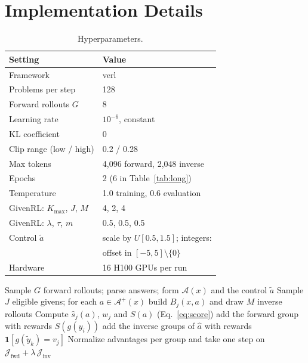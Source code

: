 \documentclass[11pt]{article}
\theoremstyle{remark}
\newcommand{\method}{GivenRL\xspace}
\newcommand{\cA}{\mathcal{A}}
\newcommand{\Aplus}{\mathcal{A}^{+}}
\newcommand{\ind}{\mathbf{1}}
\newcommand{\shat}{\hat{s}}
\newcommand{\atilde}{\tilde{a}}
\newcommand{\ahat}{\hat{a}}
\newcommand{\Kmax}{K_{\max}}
\begin{document}
\section{Implementation Details}
\label{app:impl}

\begin{table}[H]
  \centering
  \small
  \setlength{\tabcolsep}{4pt}
  \begin{tabular}{@{}ll@{}}
    \toprule
    Setting & Value \\
    \midrule
    Framework & verl \\
    Problems per step & 128 \\
    Forward rollouts $G$ & 8 \\
    Learning rate & $10^{-6}$, constant \\
    KL coefficient & 0 \\
    Clip range (low / high) & 0.2 / 0.28 \\
    Max tokens & 4,096 forward, 2,048 inverse \\
    Epochs & 2 (6 in Table~\ref{tab:long}) \\
    Temperature & 1.0 training, 0.6 evaluation \\
    \method: $\Kmax$, $J$, $M$ & 4, 2, 4 \\
    \method: $\lambda$, $\tau$, $m$ & 0.5, 0.5, 0.5 \\
    Control $\atilde$ & scale by $U[0.5,1.5]$; integers: \\
     & offset in $[-5,5]\setminus\{0\}$ \\
    Hardware & 16 H100 GPUs per run \\
    \bottomrule
  \end{tabular}
  \caption{Hyperparameters.}
  \label{tab:hparams}
\end{table}

\begin{algorithm}[H]
\caption{One \method step}
\label{alg:givenrl}
\small
\begin{algorithmic}[1]
  \State Sample $G$ forward rollouts; parse answers; form $\cA(x)$ and the control $\atilde$
  \State Sample $J$ eligible givens; for each $a\in\Aplus(x)$ build $B_j(x,a)$ and draw $M$ inverse rollouts
  \State Compute $\shat_j(a)$, $w_j$ and $S(a)$ (Eq.~\ref{eq:score})
   add the forward group with rewards $S(g(y_i))$ \EndIf
  \If{$T(\ahat)\ge m$ (Eq.~\ref{eq:gate})} add the inverse groups of $\ahat$ with rewards $\ind[g(\tilde y_k)=v_j]$ \EndIf
\EndFor
\State Normalize advantages per group and take one step on $\mathcal J_{\text{fwd}}+\lambda\,\mathcal J_{\text{inv}}$
\end{algorithmic}
\end{algorithm}
\end{document}
